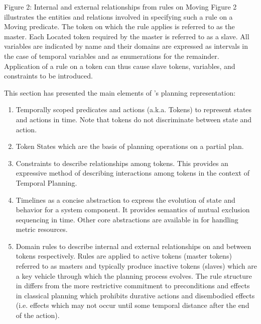 \begin{description}
Figure 2: Internal and external relationships from rules on Moving
Figure 2 illustrates the entities and relations involved in specifying
such a rule on a Moving predicate. The token on which the rule applies
is referred to as the master. Each Located token required by the
master is referred to as a slave. All variables are indicated by name
and their domains are expressed as intervals in the case of temporal
variables and as enumerations for the remainder. Application of a rule
on a token can thus cause slave tokens, variables, and constraints to
be introduced.  

\end{description}


This section has presented the main elements of \eu's planning representation:

\begin{enumerate}
    \item Temporally scoped predicates and actions (a.k.a. Tokens) to represent
    states and actions in time. Note that tokens do not discriminate between state and action. 

    \item Token States which are the basis of planning operations on a partial plan.

    \item Constraints to describe relationships among tokens. This provides an
    expressive method of describing interactions among tokens in the context of Temporal Planning.

    \item Timelines as a concise abstraction to express the evolution of state
    and behavior for a system component. It provides semantics of mutual
    exclusion sequencing in time. Other core abstractions are available in
    \eu for handling metric resources.

    \item Domain rules to describe internal and external relationships on and
     between tokens respectively. Rules are applied to active tokens (master tokens) 
     referred to as masters and typically produce inactive
     tokens (slaves) which are a key vehicle through which the planning
     process evolves. The rule structure in \eu differs from the more
     restrictive commitment to preconditions and effects in classical
     planning which prohibits durative actions and disembodied effects
     (i.e. effects which may not occur until some temporal distance after
     the end of the action).
\end{enumerate}

